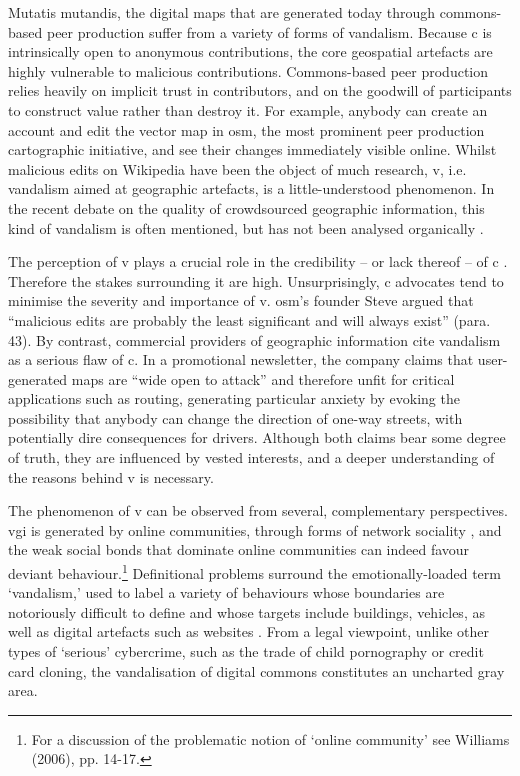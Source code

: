 \documentclass{article} \usepackage{graphicx,xspace}
\begin{document}
Mutatis mutandis, the digital maps that are generated today through com\-mons-based peer production suffer from a variety of forms of vandalism. 
Because \gls{c} is intrinsically open to anonymous contributions, the core geospatial artefacts are highly vulnerable to malicious contributions.
Commons-based peer production relies heavily on implicit trust in contributors, and on the goodwill of participants to construct value rather than destroy it.
For example, anybody can create an account and edit the vector map in \gls{osm}, the most prominent peer production cartographic initiative, and see their changes immediately visible online.
Whilst malicious edits on Wiki\-pedia have been the object of much research, \gls{v}, i.e. vandalism aimed at geographic artefacts, is a little-understood phenomenon.
In the recent debate on the quality of crowdsourced geographic information, this kind of vandalism is often mentioned, but has not been analysed organically \citep{Flanagin:2008:credibility,mooney:2010:towards,goodchild:2012:assuring}.





The perception of \gls{v} plays a crucial role in the credibility -- or lack thereof -- of \gls{c} \citep{Flanagin:2008:credibility}.
Therefore the stakes surrounding it are high.
Unsurprisingly, \gls{c} advocates tend to minimise the severity and importance of \gls{v}.
\gls{osm}'s founder Steve \cite{Coast:2010:bestmap} argued that ``malicious edits are probably the least significant and will always exist'' (para. 43).
By contrast, commercial providers of geographic information cite vandalism as a serious flaw of \gls{c}.
In a promotional newsletter, the company \cite{tomtom:2012:opensource} claims that user-generated maps are ``wide open to attack'' and therefore unfit for critical applications such as routing, generating particular anxiety by evoking the possibility that anybody can change the direction of one-way streets, with potentially dire consequences for drivers.
Although both claims bear some degree of truth, they are influenced by vested interests, and a deeper understanding of the reasons behind \gls{v} is necessary.


The phenomenon of \gls{v} can be observed from several, complementary perspectives.
\Gls{vgi} is generated by online communities, through forms of network sociality \citep{wittel:2001:netsociality}, and the weak social bonds that dominate online communities can indeed favour deviant behaviour.\footnote{For a discussion of the problematic notion of `online community' see Williams (2006), pp. 14-17. }
Definitional problems surround the emotionally-loaded term `vandalism,' used to label a variety of behaviours whose boundaries are notoriously difficult to define and whose targets include buildings, vehicles, as well as digital artefacts such as websites \citep{goldstein:1996:psychology,williams:2007:policing}.
From a legal viewpoint, unlike other types of `serious' cybercrime, such as the trade of child pornography or credit card cloning, the vandalisation of digital commons constitutes an uncharted gray area. 
\end{document}

